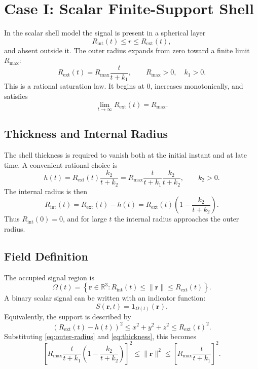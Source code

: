 \section{Case I: Scalar Finite-Support Shell}

In the scalar shell model the signal is present in a spherical layer
\[
    R_{\mathrm{int}}(t)\le r\le R_{\mathrm{ext}}(t),
\]
and absent outside it. The outer radius expands from zero toward a finite
limit \(R_{\max}\):
\begin{equation}
    R_{\mathrm{ext}}(t)
    =
    R_{\max}\frac{t}{t+k_1},
    \qquad
    R_{\max}>0,\quad k_1>0.
    \label{eq:outer-radius}
\end{equation}
This is a rational saturation law. It begins at \(0\), increases
monotonically, and satisfies
\[
    \lim_{t\to\infty}R_{\mathrm{ext}}(t)=R_{\max}.
\]

\subsection{Thickness and Internal Radius}

The shell thickness is required to vanish both at the initial instant and at
late time. A convenient rational choice is
\begin{equation}
    h(t)
    =
    R_{\mathrm{ext}}(t)\frac{k_2}{t+k_2}
    =
    R_{\max}\frac{t}{t+k_1}\frac{k_2}{t+k_2},
    \qquad k_2>0.
    \label{eq:thickness}
\end{equation}
The internal radius is then
\begin{equation}
    R_{\mathrm{int}}(t)
    =
    R_{\mathrm{ext}}(t)-h(t)
    =
    R_{\mathrm{ext}}(t)
    \left(1-\frac{k_2}{t+k_2}\right).
    \label{eq:internal-radius}
\end{equation}
Thus \(R_{\mathrm{int}}(0)=0\), and for large \(t\) the internal radius
approaches the outer radius.

\subsection{Field Definition}

The occupied signal region is
\[
    \Omega(t)
    =
    \left\{
        \bm{r}\in\mathbb{R}^3:
        R_{\mathrm{int}}(t)\le \|\bm{r}\|\le R_{\mathrm{ext}}(t)
    \right\}.
\]
A binary scalar signal can be written with an indicator function:
\begin{equation}
    S(\bm{r},t)
    =
    \mathbf{1}_{\Omega(t)}(\bm{r}).
    \label{eq:indicator-signal}
\end{equation}
Equivalently, the support is described by
\begin{equation}
    \left(R_{\mathrm{ext}}(t)-h(t)\right)^2
    \le
    x^2+y^2+z^2
    \le
    R_{\mathrm{ext}}(t)^2.
    \label{eq:shell-support}
\end{equation}
Substituting \eqref{eq:outer-radius} and \eqref{eq:thickness}, this becomes
\begin{equation}
    \left[
        R_{\max}\frac{t}{t+k_1}
        \left(1-\frac{k_2}{t+k_2}\right)
    \right]^2
    \le
    \|\bm{r}\|^2
    \le
    \left[
        R_{\max}\frac{t}{t+k_1}
    \right]^2.
    \label{eq:explicit-shell-support}
\end{equation}


